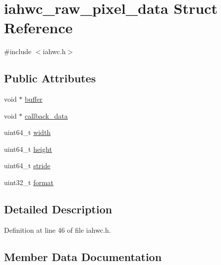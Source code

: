 \hypertarget{structiahwc__raw__pixel__data}{}\section{iahwc\+\_\+raw\+\_\+pixel\+\_\+data Struct Reference}
\label{structiahwc__raw__pixel__data}


{\ttfamily \#include $<$iahwc.\+h$>$}

\subsection*{Public Attributes}
\begin{DoxyCompactItemize}
\item 
void $\ast$ \mbox{\hyperlink{structiahwc__raw__pixel__data_ad7d42f2ede4d429072a20f791f3a2625}{buffer}}
\item 
void $\ast$ \mbox{\hyperlink{structiahwc__raw__pixel__data_ab7e2bf82485679c69226d5d42bbe7e1c}{callback\+\_\+data}}
\item 
uint64\+\_\+t \mbox{\hyperlink{structiahwc__raw__pixel__data_afa9b60fc4678e26c901c703837fdabb3}{width}}
\item 
uint64\+\_\+t \mbox{\hyperlink{structiahwc__raw__pixel__data_aa8ad90e89455a36ad2c423c33ff189fa}{height}}
\item 
uint64\+\_\+t \mbox{\hyperlink{structiahwc__raw__pixel__data_a7b63e928cb013a04cfe12a69a4cf7241}{stride}}
\item 
uint32\+\_\+t \mbox{\hyperlink{structiahwc__raw__pixel__data_afa6eeb611dda100904b14919b74b1d9d}{format}}
\end{DoxyCompactItemize}


\subsection{Detailed Description}


Definition at line 46 of file iahwc.\+h.



\subsection{Member Data Documentation}
\mbox{\label{structiahwc__raw__pixel__data_ad7d42f2ede4d429072a20f791f3a2625}} 
